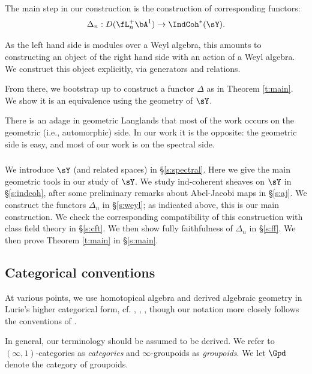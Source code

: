The main step in our construction is the construction of corresponding
functors:
%
\[
\Delta_n:D(\fL_n^+\bA^1) \to \IndCoh^*(\sY).
\]

 As the left hand side is modules over a Weyl algebra, this amounts
to constructing an object of the right hand side with an action of a Weyl
algebra. We construct this object explicitly, via generators and relations.

From there, we bootstrap up to construct a functor
$\Delta$ as in Theorem \ref{t:main}. We show it is an equivalence using
the geometry of $\sY$.

\begin{rem}
\notready

There is an adage in geometric Langlands that most of the work occurs on the
geometric (i.e., automorphic) side. In our work it is the opposite: the
geometric side is easy, and most of our work is on the spectral side.

\end{rem}

\subsubsection{}

We introduce $\sY$ (and related spaces) in \S \ref{s:spectral}. Here we
give the main geometric tools in our study of $\sY$. We study
ind-coherent sheaves on $\sY$ in \S \ref{s:indcoh}, after some preliminary
remarks about Abel-Jacobi maps in \S \ref{s:aj}. We construct the
functors $\Delta_n$ in \S \ref{s:weyl}; as indicated above, this is our main
construction. We check the corresponding compatibility of this construction
with class field theory
in \S \ref{s:cft}. We then show fully faithfulness of $\Delta_n$ in
\S \ref{s:ff}. We then prove Theorem \ref{t:main} in \S \ref{s:main}.

\subsection{Categorical conventions}

At various points, we use homotopical algebra and derived
algebraic geometry in Lurie's higher categorical form,
cf. \cite{htt}, \cite{higheralgebra}, \cite{sag}, though our notation more
closely follows the conventions of \cite{grbook}.

In general, our terminology should be assumed to be derived.
We refer to $(\infty,1)$-categories as \emph{categories} and
$\infty$-groupoids as \emph{groupoids}. We let
$\Gpd$ denote the category of groupoids.

